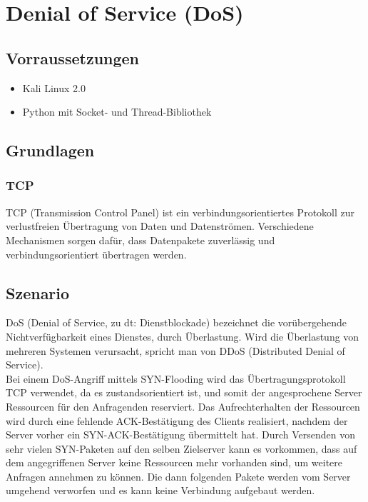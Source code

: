 \section{Denial of Service (DoS)}


\subsection*{Vorraussetzungen}

\begin{itemize}
\item Kali Linux 2.0
\item Python mit Socket- und Thread-Bibliothek
\end{itemize}


\subsection*{Grundlagen}

\subsubsection*{TCP}
TCP (Transmission Control Panel) ist ein verbindungsorientiertes Protokoll zur verlustfreien Übertragung von Daten und Datenströmen. Verschiedene Mechanismen sorgen dafür, dass Datenpakete zuverlässig und verbindungsorientiert übertragen werden.

\subsection*{Szenario}

DoS (Denial of Service, zu dt: Dienstblockade) bezeichnet die vorübergehende Nichtverfügbarkeit eines Dienstes, durch Überlastung. Wird die Überlastung von mehreren Systemen verursacht,
spricht man von DDoS (Distributed Denial of Service). \\
Bei einem DoS-Angriff mittels SYN-Flooding wird das Übertragungsprotokoll TCP verwendet, da es zustandsorientiert ist, und somit der angesprochene Server Ressourcen für den Anfragenden reserviert.
 Das Aufrechterhalten der Ressourcen wird durch eine fehlende ACK-Bestätigung des Clients realisiert, nachdem der Server vorher ein SYN-ACK-Bestätigung übermittelt hat. Durch Versenden von sehr vielen SYN-Paketen auf den selben Zielserver kann es vorkommen, dass auf dem angegriffenen Server keine Ressourcen mehr vorhanden sind, um weitere Anfragen annehmen zu können. Die dann folgenden Pakete werden vom Server umgehend verworfen und es kann keine Verbindung aufgebaut werden. \cite{dnssec}

